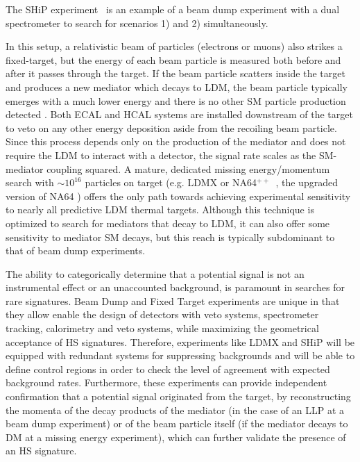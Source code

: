 \documentclass[../report.tex]{subfiles}
\begin{document}
The SHiP experiment~\cite{Anelli:2015pba,Alekhin:2015byh} is an example of a beam dump experiment with a dual spectrometer to search for scenarios 1) and 2) simultaneously.

 In this setup, a relativistic beam of particles (electrons or muons) also strikes a fixed-target, but the energy of each beam particle is measured both before and after it passes through the target. If the beam particle scatters inside the target and produces a new mediator which decays to LDM, the beam particle typically emerges with a much lower energy and there is no other SM particle production detected \cite{Izaguirre:2014bca,Banerjee:2016tad,Gninenko:2014pea,Kahn:2018cqs}. Both ECAL and HCAL systems are installed downstream of the target to veto on any other energy deposition aside from the recoiling beam particle. Since this process depends only on the production of the mediator and does not require the LDM to interact with a detector, the signal rate scales as the SM-mediator coupling squared. A mature, dedicated missing energy/momentum search with $\sim 10^{16}$ particles on target (e.g. LDMX \cite{Akesson:2018vlm,Berlin:2018bsc} or NA64$^{++}$~\cite{Beacham:2019nyx}, the upgraded version of NA64 \cite{Banerjee:2016tad}) offers the only path towards achieving experimental sensitivity to nearly all predictive LDM thermal targets. Although this technique is optimized to search for mediators that decay to LDM, it can also offer some sensitivity to mediator SM decays, but this reach is typically subdominant to that of beam dump experiments. 

The ability to categorically determine that a potential signal is not an instrumental effect or an unaccounted background, is paramount in searches for rare signatures. Beam Dump and Fixed Target experiments are unique in that they allow enable the design of detectors with veto systems, spectrometer tracking, calorimetry and veto systems, while maximizing the geometrical acceptance of HS signatures. Therefore, experiments like LDMX and SHiP will be equipped with redundant systems for suppressing backgrounds and will  be able to define control regions in order to check the level of agreement with expected background rates. Furthermore, these experiments can provide independent confirmation that a potential signal originated from the target, by reconstructing the momenta of the decay products of the mediator (in the case of an LLP at a beam dump experiment) or of the beam particle itself (if the mediator decays to DM at a missing energy experiment), which can further validate the presence of an HS signature.  
\end{document}
